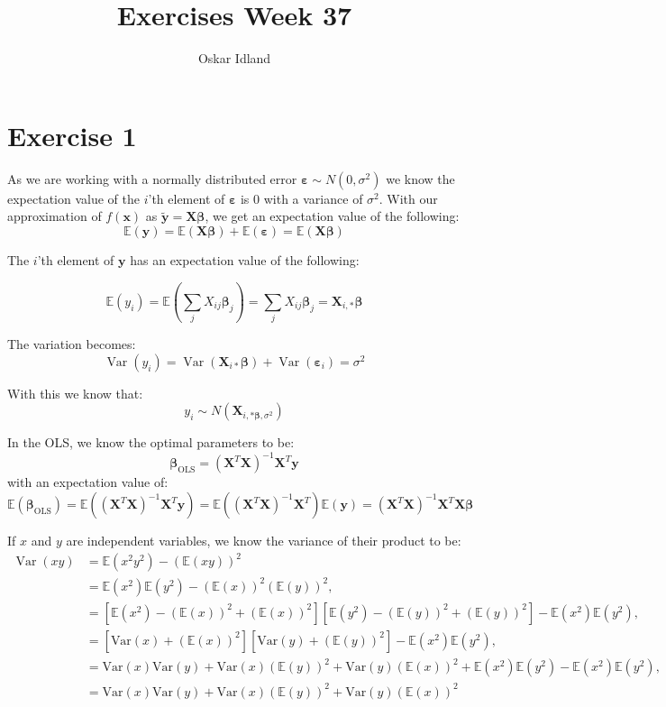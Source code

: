 \documentclass{article}
\author{Oskar Idland}
\title{Exercises Week 37}
\date{}
\begin{document}
\maketitle
\newpage

\section*{Exercise 1} 
As we are working with a normally distributed error $ \mathbf{\pmb{ε}} ∼ N(0, σ^2)$ we know the expectation value of the $i$'th element of $\pmb{ε}$ is $0$ with a variance of $σ^2$. With our approximation of $f(\mathbf{x})$ as $\tilde{\mathbf{y}} = \mathbf{X}\pmb{β}$, we get an expectation value of the following:
\[
\mathbb{E}(\mathbf{y}) = \mathbb{E}(\mathbf{X}\pmb{β}) + \mathbb{E} (\pmb{ε}) = \mathbb{E}(\mathbf{X}\pmb{β}) 
\]

The $i$'th element of $\mathbf{y}$ has an expectation value of the following:

\[
\mathbb{E}(y_i) = \mathbb{E}\left(∑_{j}^{} X_{ij}\pmb{β}_j\right) = ∑_{j}^{} X_{ij}\pmb{β}_j = \mathbf{X}_{i,*}\pmb{β}
\]

The variation becomes:
\[
\operatorname{Var}(y_i) = \operatorname{Var}\left(\mathbf{X}_{i*}\pmb{β}\right) + \operatorname{Var}(\pmb{ε}_i) = σ^2
\]

With this we know that:
\[
y_i ∼ N(\mathbf{X}_{i,*\pmb{β}, σ^2}) 
\]

In the OLS, we know the optimal parameters to be: 
\[
\pmb{β}_{\text{OLS}} = \left(\mathbf{X}^{T}\mathbf{X}\right)^{-1} \mathbf{X}^{T}\mathbf{y}
\]
with an expectation value of:
\[
\mathbb{E}\left(\pmb{β}_{\text{OLS}}\right) = \mathbb{E}\left(\left(\mathbf{X}^{T}\mathbf{X}\right)^{-1} \mathbf{X}^{T}\mathbf{y}\right) = \mathbb{E}\left(\left(\mathbf{X}^{T}\mathbf{X}\right)^{-1} \mathbf{X}^{T}\right) \mathbb{E}(\mathbf{y}) = \left(\mathbf{X}^{T}\mathbf{X}\right)^{-1} \mathbf{X}^{T}\mathbf{X}\pmb{β}
\]

If $x$ and $y$ are independent variables, we know the variance of their product to be:
\begin{align*}
\operatorname{Var}(xy) &= \mathbb{E}\left(x^2y^2\right) - \left(\mathbb{E}(xy)\right)^2 \\
&= \mathbb{E}(x^2)\mathbb{E}(y^2) - \left(\mathbb{E}(x)\right)^2\left(\mathbb{E}(y)\right)^2,
\\
&= \left[\mathbb{E}(x^2) - \left(\mathbb{E}(x)\right)^2 + \left(\mathbb{E}(x)\right)^2\right]\left[\mathbb{E}(y^2) - \left(\mathbb{E}(y)\right)^2 + \left(\mathbb{E}(y)\right)^2\right] - \mathbb{E}(x^2)\mathbb{E}(y^2),
\\
&= \left[\textrm{Var}(x) + \left(\mathbb{E}(x)\right)^2\right]\left[\textrm{Var}(y) + \left(\mathbb{E}(y)\right)^2\right] - \mathbb{E}(x^2)\mathbb{E}(y^2), \\
&= \textrm{Var}(x)\textrm{Var}(y) + \textrm{Var}(x)(\mathbb{E}(y))^2 + \textrm{Var}(y)(\mathbb{E}(x))^2 +\mathbb{E}(x^2)\mathbb{E}(y^2)- \mathbb{E}(x^2)\mathbb{E}(y^2),
\\
&= \textrm{Var}(x)\textrm{Var}(y) + \textrm{Var}(x)(\mathbb{E}(y))^2 + \textrm{Var}(y)(\mathbb{E}(x))^2 
\end{align*}
\end{document}
